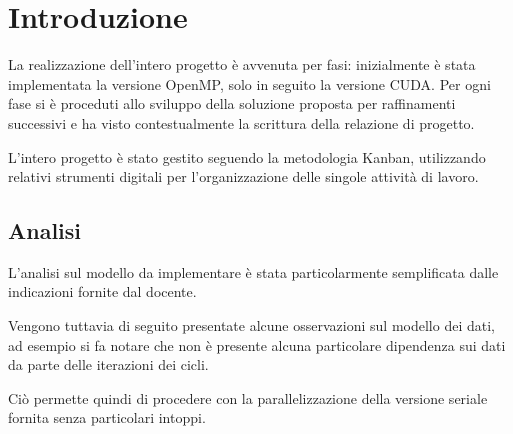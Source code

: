 \section{Introduzione}

La realizzazione dell'intero progetto è avvenuta per fasi: inizialmente è stata
implementata la versione OpenMP, solo in seguito la versione CUDA.
Per ogni fase si è proceduti allo sviluppo della soluzione proposta per
raffinamenti successivi e ha visto contestualmente la scrittura della relazione
di progetto.

L'intero progetto è stato gestito seguendo la metodologia Kanban, utilizzando
relativi strumenti digitali per l'organizzazione delle singole attività di
lavoro.

\subsection{Analisi}
L'analisi sul modello da implementare è stata particolarmente semplificata dalle
indicazioni fornite dal docente.

Vengono tuttavia di seguito presentate alcune osservazioni sul modello dei dati,
ad esempio si fa notare che non è presente alcuna particolare dipendenza sui
dati da parte delle iterazioni dei cicli.

Ciò permette quindi di procedere con la parallelizzazione della versione seriale
fornita senza particolari intoppi.
